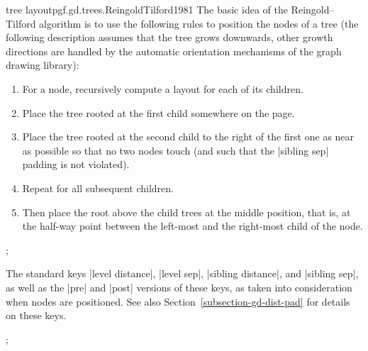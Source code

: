\begin{gdalgorithm}{tree layout}{pgf.gd.trees.ReingoldTilford1981}
  The basic idea of the Reingold--Tilford algorithm is to use the
  following rules to position the nodes of a tree (the following
  description assumes that the tree grows downwards, other growth
  directions are handled by the automatic orientation mechanisms of
  the graph drawing library): 
  \begin{enumerate}
  \item For a node, recursively compute a layout for each of its children.
  \item Place the tree rooted at the first child somewhere on the page.
  \item Place the tree rooted at the second child to the right of the
    first one as near as possible so that no two nodes touch (and such
    that the |sibling sep| padding is not violated).
  \item Repeat for all subsequent children.
  \item Then place the root above the child trees at the middle
    position, that is, at the half-way point between the left-most and
    the right-most child of the node.
  \end{enumerate}
\begin{codeexample}[]
\tikz [tree layout, sibling distance=8mm]
;
\end{codeexample}
  The standard keys |level distance|, |level sep|, |sibling distance|,
  and |sibling sep|, as well as the |pre| and |post| versions of these
  keys, as taken into consideration when nodes are positioned. See also
  Section~\ref{subsection-gd-dist-pad} for details on these keys. 
\begin{codeexample}[]
\tikz [tree layout, grow=-30,
       sibling distance=0mm, level distance=0mm,]
;
\end{codeexample}


\end{gdalgorithm}
